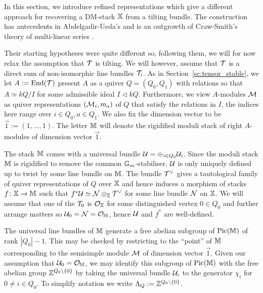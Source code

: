\documentclass[12pt]{amsart}
\begin{document}
In this section, we introduce refined representations which give a different approach for recovering a DM-stack $\mathbb{X}$ from a tilting bundle. The construction has antecedents in Abdelgadir-Ueda's \cite{AU} and is an outgrowth of Craw-Smith's theory of multi-linear series \cite{Craw-Smith}. 

Their starting hypotheses were quite different so, following them, we will for now relax the assumption that $\mathcal{T}$ is tilting. We will however, assume that $\mathcal{T}$ is a direct sum of non-isomorphic line bundles $\mathcal{T}_i$. As in Section~\ref{sc:tensor_stable}, we let $A := \operatorname{End}(\mathcal{T})$ present $A$ as a quiver $Q = (Q_0,Q_1)$ with relations so that $A \simeq kQ/I$ for some admissible ideal $I\triangleleft kQ$. Furthermore, we view $A$-modules $\mathcal{M}$ as quiver representations $(\mathcal{M}_i,m_a)$ of $Q$ that satisfy the relations in $I$, the indices here range over $i \in Q_0, a \in Q_1$.
We also fix the dimension vector to be $\vec{1}:= (1,\ldots,1)$.
The letter $\mathbb{M}$ will denote the rigidified moduli stack of right  $A$-modules of dimension vector $\vec{1}$.

The stack $\mathbb{M}$ comes with a universal bundle $\mathcal{U}  = \oplus_{i \in Q_0} \mathcal{U}_i$.
Since the moduli stack $\mathbb{M}$ is rigidified to remove the common $\mathbb{G}_m$-stabiliser, $\mathcal{U}$ is only uniquely defined up to twist by some line bundle on $\mathbb{M}$.
The bundle $\mathcal{T}^{\vee}$ gives a tautological family of quiver representations of $Q$ over $\mathbb{X}$ and hence induces a morphism of stacks $f \colon \mathbb{X} \rightarrow \mathbb{M}$ such that $f^* \mathcal{U} \simeq \mathcal{N} \otimes_{\mathbb{X}} \mathcal{T}^{\vee}$ for some line bundle $\mathcal{N}$ on $\mathbb{X}$.
We will assume that one of the $\mathcal{T}_0$ is $\mathcal{O}_{\mathbb{X}}$ for some distinguished vertex $0 \in Q_0$ and further arrange matters so $\mathcal{U}_0 = \mathcal{N} = \mathcal{O}_{\mathbb{M}}$, hence $\mathcal{U}$ and $f^*$ are well-defined.

The universal line bundles of $\mathbb{M}$ generate a free abelian subgroup of $\operatorname{Pic}(\mathbb{M})$ of rank $|Q_0|-1$.
This may be checked by restricting to the ``point'' of $\mathbb{M}$ corresponding to the semisimple module $\mathcal{M}$ of dimension vector $\vec{1}$.
Given our assumption that $\mathcal{U}_0 = \mathcal{O}_{\mathbb{M}}$, we may identify this subgroup of $\operatorname{Pic}(\mathbb{M})$ with the free abelian group $\mathbb{Z}^{Q_0 \setminus \{0\}}$ by taking the universal bundle $\mathcal{U}_i$ to the generator $\chi_i$ for $0 \neq i \in Q_0$.
To simplify notation we write $\Lambda_Q:= \mathbb{Z}^{Q_0 \setminus \{0\}}$.
\end{document}
